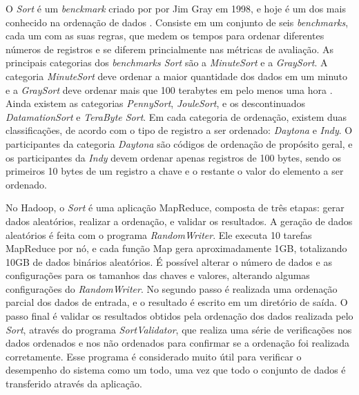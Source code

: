 O \textit{Sort} é um \textit{benckmark} criado por por Jim Gray em 1998, e hoje é um dos mais conhecido na ordenação de dados \cite{Gray:1998}. 
Consiste em um conjunto de seis \textit{benchmarks}, cada um com as suas regras, que medem os tempos para ordenar diferentes números de registros e se diferem princialmente nas métricas de avaliação. 
As principais categorias dos \textit{benchmarks Sort} são a \textit{MinuteSort} e a \textit{GraySort}. A categoria \textit{MinuteSort} deve ordenar a maior quantidade dos dados em um minuto e a \textit{GraySort} deve ordenar mais que 100 terabytes em pelo menos uma hora \cite{White:2009}. Ainda existem as categorias \textit{PennySort}, \textit{JouleSort}, e os descontinuados  \textit{DatamationSort} e \textit{TeraByte Sort}. 
Em cada categoria de ordenação, existem duas classificações, de acordo com o tipo de registro a ser ordenado: \textit{Daytona} e \textit{Indy}. O participantes da categoria \textit{Daytona} são códigos de ordenação de propósito geral, e os participantes da \textit{Indy} devem ordenar apenas registros de 100 bytes, sendo os primeiros 10 bytes de um registro a chave e o restante o valor do elemento a ser ordenado.


No Hadoop, o \textit{Sort} é uma aplicação MapReduce, composta de três etapas: gerar dados aleatórios, realizar a ordenação, e validar os resultados.
A geração de dados aleatórios é feita com o programa \textit{RandomWriter}. Ele executa 10 tarefas MapReduce por nó, e cada função Map gera aproximadamente 1GB,  totalizando 10GB de dados binários aleatórios. É possível alterar o número de dados e as configurações para os tamanhos das chaves e valores, alterando algumas configurações do \textit{RandomWriter}.
No segundo passo é realizada uma ordenação parcial dos dados de entrada, e  o resultado é escrito em um diretório de saída. 
O passo final é validar os resultados obtidos pela ordenação dos dados realizada pelo \textit{Sort}, através do programa \textit{SortValidator}, que realiza uma série de verificações nos dados ordenados e nos não ordenados para confirmar se a ordenação foi realizada corretamente. 
Esse programa é considerado muito útil para verificar o desempenho do sistema como um todo, uma vez que todo o conjunto de dados é transferido através da aplicação.

